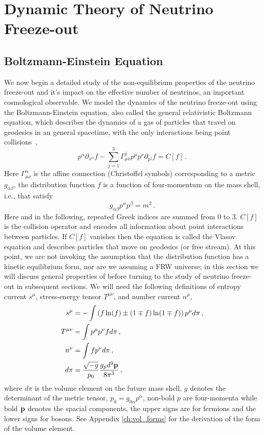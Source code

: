 \section{Dynamic Theory of Neutrino Freeze-out}\label{part3}
\subsection{Boltzmann-Einstein Equation}
We now begin a detailed study of the non-equilibrium properties of the neutrino freeze-out and it's impact on the effective number of neutrinos, an important cosmological observable. We model the dynamics of the neutrino freeze-out using the Boltzmann-Einstein equation, also called the general relativistic Boltzmann equation, which describes the dynamics of a gas of particles that travel on geodesics in an general spacetime, with the only interactions being point collisions~\cite{Andreasson:2011ng,cercignani,Choquet-Bruhat:2009xil,ehlers},
\begin{equation}\label{boltzmann_einstein}
p^\alpha\partial_{x^\alpha}f-\sum_{j=1}^3\Gamma^j_{\mu\nu}p^\mu p^\nu\partial_{p^j}f=C[f]\,.
\end{equation}
Here $ \Gamma^\alpha_{\mu\nu}$ is the affine connection (Christoffel symbols) corresponding to a metric $g_{\alpha\beta}$,   the distribution function $f$ is a function of four-momentum on the mass shell, i.e., that satisfy
 \begin{equation}
g_{\alpha\beta}p^\alpha p^\beta=m^2\,.
\end{equation}
Here and in the following,  repeated Greek indices are summed from $0$ to $3$.  $C[f]$ is the collision operator and encodes all information about point interactions between particles.  If $C[f]$ vanishes then the equation is called the Vlasov equation and describes particles that move on geodesics (or free stream).  At this point, we are  not invoking the assumption that the distribution function has a kinetic equilibrium form, nor are we assuming a FRW universe; in this section we will discuss  general properties of  before turning to the study of neutrino freeze-out in subsequent sections.   We will need the following definitions of entropy current $s^\mu$, stress-energy tensor ${T}^{\mu\nu}$, and number current $n^\mu$,
\begin{align}
\label{smdef} s^\mu&=-\int \left(f\ln(f)\pm(1\mp f)\ln(1\mp f)\right)p^\mu d\pi\,,\\
\label{Tmndef}{T}^{\mu\nu}&=\int p^\mu p^\nu f d\pi\,,\\
\label{nmdef} n^\nu&=\int f p^\nu d\pi\,,\\
d\pi&=\frac{\sqrt{-g}}{p_0}\frac{g_pd^3{\bf p}}{8\pi^3}\,,
\end{align}
where $d\pi$ is the volume element on the future mass shell, $g$ denotes the determinant of the metric tensor, $p_0=g_{0\alpha} p^\alpha$, non-bold $p$ are four-momenta while bold ${\bf p}$ denotes the spacial components, the upper signs are for fermions and the lower signs for bosons. See Appendix \ref{ch:vol_forms} for the derivation of the form of the volume element.
